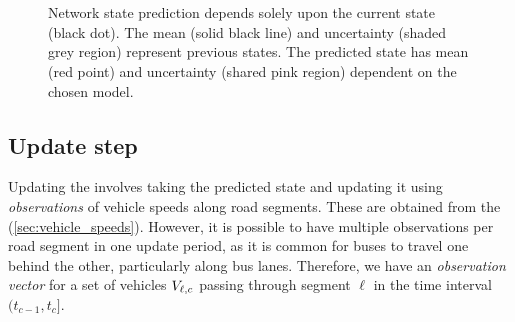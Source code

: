 \begin{knitrout}\small
{}\color{fgcolor}\begin{figure}

{\centering {}\\
\\

}

\caption[Network state prediction using constant speed and historical trend models]{Network state prediction depends solely upon the current state (black dot). The mean (solid black line) and uncertainty (shaded grey region) represent previous states. The predicted state has mean (red point) and uncertainty (shared pink region) dependent on the chosen model.}\label{fig:nw_kf}
\end{figure}


\end{knitrout}


\subsection{Update step}
\label{sec:kf_update}

Updating the \kf{} involves taking the predicted state and updating it using \emph{observations} of vehicle speeds along road segments. These are obtained from the \pf{} (\cref{sec:vehicle_speeds}). However, it is possible to have multiple observations per road segment in one update period, as it is common for buses to travel one behind the other, particularly along bus lanes. Therefore, we have an \emph{observation vector} for a set of vehicles $V_{\ell,c}$ passing through segment $\ell$ in the time interval $(t_{c-1}, t_c]$.


